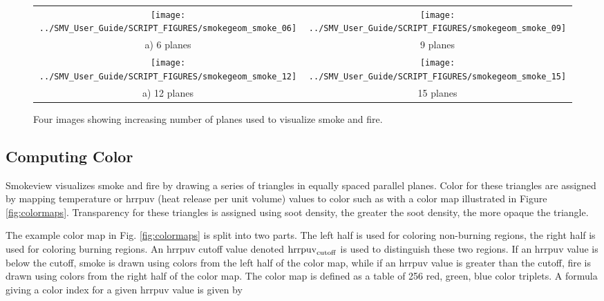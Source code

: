 {\begin{figure}[bph]
\begin{center}
\begin{tabular}{cc}
\texttt{[image: ../SMV\_User\_Guide/SCRIPT\_FIGURES/smokegeom\_smoke\_06]}&
\texttt{[image: ../SMV\_User\_Guide/SCRIPT\_FIGURES/smokegeom\_smoke\_09]}\\
a) 6 planes&9 planes\\
\texttt{[image: ../SMV\_User\_Guide/SCRIPT\_FIGURES/smokegeom\_smoke\_12]}&
\texttt{[image: ../SMV\_User\_Guide/SCRIPT\_FIGURES/smokegeom\_smoke\_15]}\\
a) 12 planes&15 planes\\
\end{tabular}
\end{center}
\caption{Four images showing increasing number of planes used to visualize smoke and fire.}
\label{fig:smokenum}
\end{figure}



\subsection{Computing Color}

Smokeview visualizes smoke and fire by drawing a series of triangles in equally spaced parallel planes.
Color for these triangles are assigned by mapping temperature or hrrpuv (heat release per unit volume) values
to color such as with a color map illustrated in Figure \ref{fig:colormaps}.
Transparency for these triangles is assigned using soot density, the greater the soot density, the more opaque the triangle.

The example color map in Fig.
\ref{fig:colormaps} is split into two parts.  The left half is used
for coloring non-burning regions, the right half is used for coloring burning regions.
An hrrpuv cutoff value denoted ${\rm hrrpuv}_{\rm cutoff}$ is used to
distinguish these two regions.
If an hrrpuv value is below the cutoff,
smoke is drawn using colors from the left half of the color map, while if an hrrpuv value is greater than the cutoff,
fire is drawn using colors from the right half of the color map.  The color map is defined as a table
of 256 red, green, blue color triplets.  A formula giving a color index for a given hrrpuv value is given by

\newcommand{\hrr}{{\rm hrr}}
\newcommand{\hrrcutoff}{{\rm hrr}_{\rm cutoff}}
\newcommand{\hrrmax}{{\rm hrr}_{\rm max}}

}
